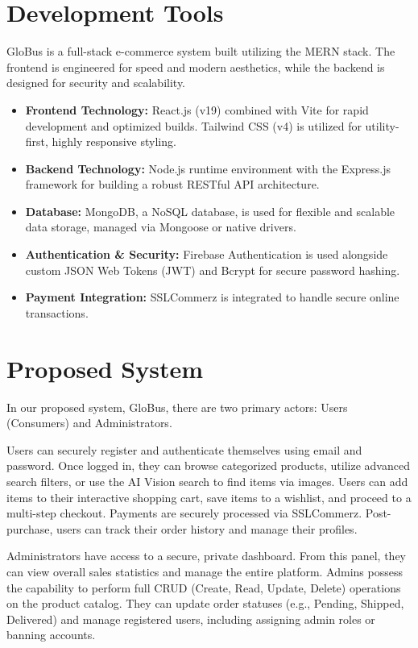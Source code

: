 \section{Development Tools}
GloBus is a full-stack e-commerce system built utilizing the MERN stack. The frontend is engineered for speed and modern aesthetics, while the backend is designed for security and scalability.
\begin{itemize}
    \item \textbf{Frontend Technology:} React.js (v19) combined with Vite for rapid development and optimized builds. Tailwind CSS (v4) is utilized for utility-first, highly responsive styling.
    
    \item \textbf{Backend Technology:} Node.js runtime environment with the Express.js framework for building a robust RESTful API architecture.
    
    \item \textbf{Database:} MongoDB, a NoSQL database, is used for flexible and scalable data storage, managed via Mongoose or native drivers.
    
    \item \textbf{Authentication \& Security:} Firebase Authentication is used alongside custom JSON Web Tokens (JWT) and Bcrypt for secure password hashing.
    
    \item \textbf{Payment Integration:} SSLCommerz is integrated to handle secure online transactions.
\end{itemize}

\section{Proposed System}
In our proposed system, GloBus, there are two primary actors: Users (Consumers) and Administrators.

Users can securely register and authenticate themselves using email and password. Once logged in, they can browse categorized products, utilize advanced search filters, or use the AI Vision search to find items via images. Users can add items to their interactive shopping cart, save items to a wishlist, and proceed to a multi-step checkout. Payments are securely processed via SSLCommerz. Post-purchase, users can track their order history and manage their profiles.

Administrators have access to a secure, private dashboard. From this panel, they can view overall sales statistics and manage the entire platform. Admins possess the capability to perform full CRUD (Create, Read, Update, Delete) operations on the product catalog. They can update order statuses (e.g., Pending, Shipped, Delivered) and manage registered users, including assigning admin roles or banning accounts.

